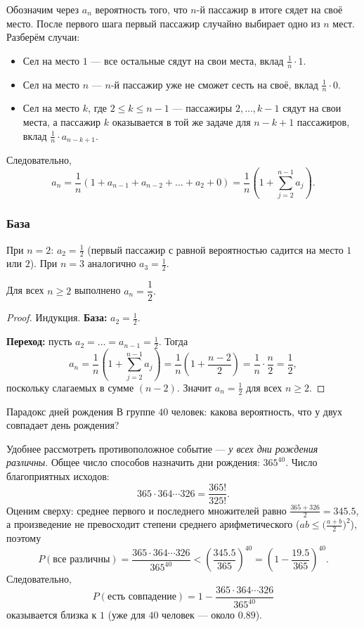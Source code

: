 Обозначим через \(a_n\) вероятность того, что \(n\)-й пассажир в итоге сядет на своё место. После первого шага первый пассажир случайно выбирает одно из \(n\) мест. Разберём случаи:
\begin{itemize}
	\item Сел на место \(1\) — все остальные сядут на свои места, вклад \(\tfrac1n\cdot 1.\)
	\item Сел на место \(n\) — \(n\)-й пассажир уже не сможет сесть на своё, вклад \(\tfrac1n\cdot 0.\)
	\item Сел на место \(k\), где \(2\le k\le n-1\) — пассажиры \(2,\dots,k-1\) сядут на свои места, а пассажир \(k\) оказывается в той же задаче для \(n-k+1\) пассажиров, вклад \(\tfrac1n\cdot a_{n-k+1}.\)
\end{itemize}
Следовательно,
\[
a_n=\frac1n\left(1+a_{n-1}+a_{n-2}+\dots+a_2+0\right)
=\frac1n\left(1+\sum_{j=2}^{n-1}a_j\right).
\]

\subsubsection*{База}

При \(n=2\): \(a_2=\tfrac12\) (первый пассажир с равной вероятностью садится на место \(1\) или \(2\)). При \(n=3\) аналогично \(a_3=\tfrac12\).

\begin{Proposition}{}{}
	Для всех \(n\ge 2\) выполнено \(a_n=\dfrac12.\)
\end{Proposition}

\begin{proof}
	Индукция. \textbf{База:} \(a_2=\tfrac12\).

	\textbf{Переход:} пусть \(a_2=\dots=a_{n-1}=\tfrac12\). Тогда
	\[
	a_n
	=\frac1n\left(1+\sum_{j=2}^{n-1}a_j\right)
	=\frac1n\left(1+\frac{n-2}{2}\right)
	=\frac1n\cdot\frac{n}{2}
	=\frac12,
	\]
	поскольку слагаемых в сумме \((n-2)\). Значит \(a_n=\tfrac12\) для всех \(n\ge 2\).
\end{proof}

\begin{Example}{Парадокс дней рождения}{}
	В группе $40$ человек: какова вероятность, что у двух совпадает день рождения?
\end{Example}
Удобнее рассмотреть противоположное событие — \textit{у всех дни рождения различны}. Общее число способов назначить дни рождения: \(365^{40}\). Число благоприятных исходов:
\[
365\cdot 364\cdots 326=\frac{365!}{325!}.
\]
Оценим сверху: среднее первого и последнего множителей равно $\tfrac{365+326}{2}=345.5$, а произведение не превосходит степени среднего арифметического ($ab\le\bigl(\tfrac{a+b}{2}\bigr)^2$), поэтому
\[
P(\text{все различны})
=\frac{365\cdot 364\cdots 326}{365^{40}}
<\left(\frac{345.5}{365}\right)^{40}
=\left(1-\frac{19.5}{365}\right)^{40}.
\]
Следовательно,
\[
P(\text{есть совпадение})
=1-\frac{365\cdot 364\cdots 326}{365^{40}}
\]
оказывается близка к $1$ (уже для $40$ человек — около $0.89$).


